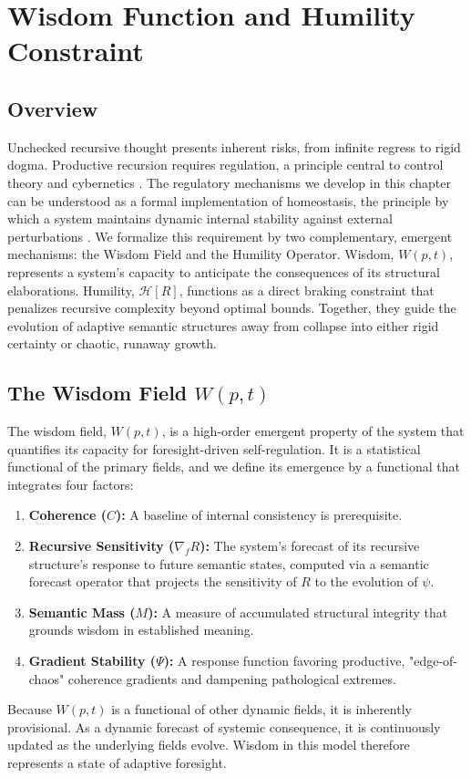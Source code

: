 \chapter{Wisdom Function and Humility Constraint}

\section{Overview}

Unchecked recursive thought presents inherent risks, from infinite regress to rigid dogma. Productive recursion requires regulation, a principle central to control theory and cybernetics \autocite{Kalman1960, AndersonMoore1990, Wiener1948, Ashby1952}. The regulatory mechanisms we develop in this chapter can be understood as a formal implementation of homeostasis, the principle by which a system maintains dynamic internal stability against external perturbations \autocite{Cannon1932}. We formalize this requirement by two complementary, emergent mechanisms: the Wisdom Field and the Humility Operator. Wisdom, \(W(p,t)\), represents a system's capacity to anticipate the consequences of its structural elaborations. Humility, \(\mathcal{H}[R]\), functions as a direct braking constraint that penalizes recursive complexity beyond optimal bounds. Together, they guide the evolution of adaptive semantic structures away from collapse into either rigid certainty or chaotic, runaway growth.

\section{The Wisdom Field \(W(p, t)\)}

The wisdom field, \(W(p, t)\), is a high-order emergent property of the system that quantifies its capacity for foresight-driven self-regulation. It is a statistical functional of the primary fields, and we define its emergence by a functional that integrates four factors:
\begin{enumerate}
    \item \textbf{Coherence (\(C\)):} A baseline of internal consistency is prerequisite.
    \item \textbf{Recursive Sensitivity (\(\nabla_f R\)):} The system's forecast of its recursive structure's response to future semantic states, computed via a semantic forecast operator that projects the sensitivity of \(R\) to the evolution of \(\psi\).
    \item \textbf{Semantic Mass (\(M\)):} A measure of accumulated structural integrity that grounds wisdom in established meaning.
    \item \textbf{Gradient Stability (\(\Psi\)):} A response function favoring productive, "edge-of-chaos" coherence gradients and dampening pathological extremes.
\end{enumerate}
Because \(W(p,t)\) is a functional of other dynamic fields, it is inherently provisional. As a dynamic forecast of systemic consequence, it is continuously updated as the underlying fields evolve. Wisdom in this model therefore represents a state of adaptive foresight.

